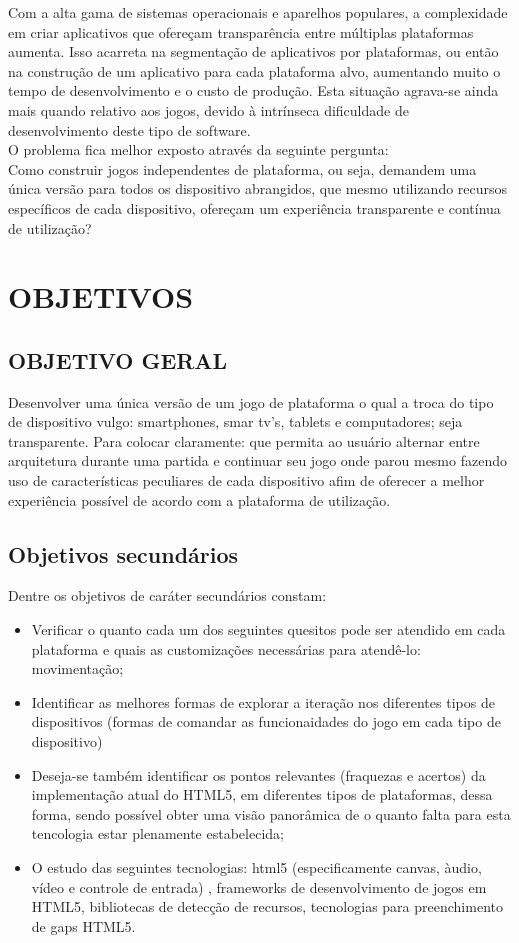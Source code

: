 \documentclass{article}
\begin{document}
Com a alta gama de sistemas operacionais e aparelhos populares, a complexidade em criar aplicativos que ofereçam transparência entre múltiplas plataformas aumenta. Isso acarreta na segmentação de aplicativos por plataformas, ou então na construção de um aplicativo para cada plataforma alvo, aumentando muito o tempo de desenvolvimento e o custo de produção. Esta situação agrava-se ainda mais quando relativo aos jogos, devido à intrínseca dificuldade de desenvolvimento deste tipo de software. 
\\
O problema fica melhor exposto através da seguinte pergunta: 
\\
	Como construir jogos independentes de plataforma, ou seja, demandem uma única versão para todos os dispositivo abrangidos, que mesmo utilizando recursos específicos de cada dispositivo, ofereçam um experiência transparente e contínua de utilização?
\section{OBJETIVOS}
\subsection{OBJETIVO GERAL} 

Desenvolver uma única versão de um jogo de plataforma o qual a troca do tipo de dispositivo vulgo: smartphones, smar tv's, tablets e computadores; seja transparente. Para colocar claramente: que  permita ao usuário alternar entre arquitetura durante uma partida e continuar seu jogo onde parou mesmo fazendo uso de características peculiares de cada dispositivo afim de oferecer a melhor experiência possível de acordo com a plataforma de utilização. 

\subsection{Objetivos secundários}

Dentre os objetivos de caráter secundários constam:

\begin{itemize}
\item Verificar o quanto cada um dos seguintes quesitos pode ser atendido em cada plataforma e quais as customizações necessárias para atendê-lo: movimentação;
\item Identificar as melhores formas de explorar a iteração nos diferentes tipos de dispositivos (formas de comandar as funcionaidades do jogo em cada tipo de dispositivo)
\item Deseja-se também identificar os pontos relevantes (fraquezas e acertos) da implementação atual do HTML5, em diferentes tipos de plataformas, dessa forma, sendo possível obter uma visão panorâmica de o quanto falta para esta tencologia estar plenamente estabelecida;
\item O estudo das seguintes tecnologias: html5 (especificamente canvas, àudio, vídeo e controle de entrada) , frameworks de desenvolvimento de jogos em HTML5, bibliotecas de detecção de recursos, tecnologias para preenchimento de gaps HTML5.
\end{itemize}
\end{document}
